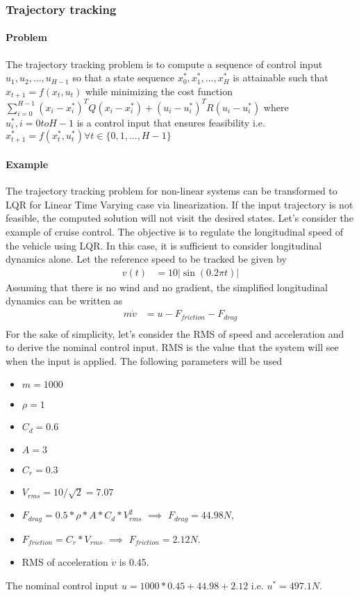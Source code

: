 \subsubsection{Trajectory tracking}
\paragraph{Problem} The trajectory tracking problem is to compute a sequence of control input $u_1, u_2, ..., u_{H-1}$ so that a state sequence $x_0^*, x_1^*, ..., x_H^*$ is attainable such that $x_{t+1}=f(x_t, u_t)$ while minimizing the cost function $\sum_{i=0}^{H-1}(x_i - x_i^*)^T Q (x_i - x_i^*) + (u_i - u_i^*)^T R (u_i - u_i^*)$ where $u_i^*, i=0 to H-1$ is a control input that ensures feasibility i.e. $x_{t+1}^*=f(x_t^*, u_t^*) {} \forall t \in \{0, 1, ..., H-1\}$
\paragraph{Example}
The trajectory tracking problem for non-linear systems can be transformed to LQR for Linear Time Varying case via linearization. If the input trajectory is not feasible, the computed solution will not visit the desired states.
Let's consider the example of cruise control. The objective is to regulate the longitudinal speed of the vehicle using LQR. In this case, it is sufficient to consider longitudinal dynamics alone. Let the reference speed to be tracked be given by
\begin{align}
    v(t) &= 10|\sin(0.2\pi t)| \label{chap_2:eq:vel_traj}
\end{align}
Assuming that there is no wind and no gradient, the simplified longitudinal dynamics can be written as
\begin{align}
    m\dot{v} &= u - F_{friction} - F_{drag}  \label{chap_2:eq:long_traj_tracking}\\ 
\end{align}
For the sake of simplicity, let's consider the RMS of speed and acceleration and to derive the nominal control input. RMS is the value that the system will see when the input is applied.
The following parameters will be used 
\begin{itemize}
\item[] $m = 1000$
\item[] $\rho = 1$
\item[] $C_d =0.6$
\item[] $A = 3$
\item[] $C_r=0.3$
\item[] $V_{rms} = 10/\sqrt{2} = 7.07$
\item[] $F_{drag} = 0.5 * \rho * A * C_d * V_{rms}^2$ $\implies$ $F_{drag}=44.98 N$, 
\item[] $F_{friction}=C_r*V_{rms}$ $\implies$ $F_{friction}=2.12 N$. 
\item[] RMS of acceleration $\dot{v}$ is $0.45$.
\end{itemize}
The nominal control input $u = 1000 * 0.45 + 44.98 + 2.12$ i.e. $u^{*}=497.1 N$.


